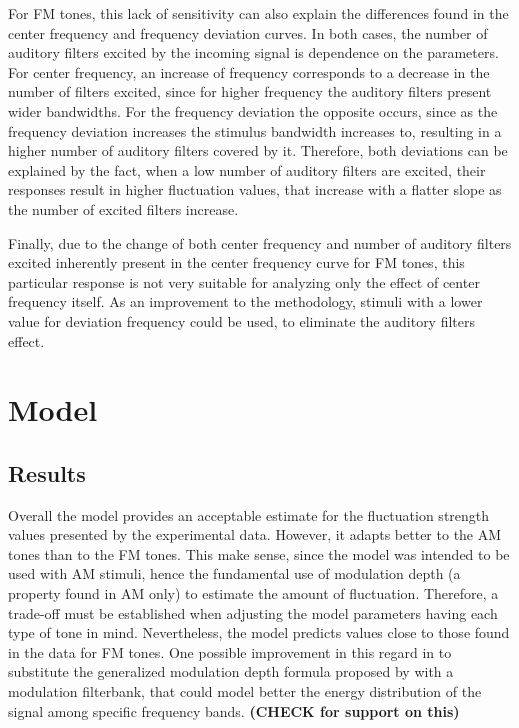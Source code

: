 \documentclass[../main.tex]{subfiles}
\begin{document}
For \gls{FM} tones, this lack of sensitivity can also explain the differences
found in the center frequency and frequency deviation curves. In both cases,
the number of auditory filters excited by the incoming signal is dependence on
the parameters. For center frequency, an increase of frequency corresponds to a
decrease in the number of filters excited, since for higher frequency the
auditory filters present wider bandwidths. For the frequency deviation the
opposite occurs, since as the frequency deviation increases the stimulus
bandwidth increases to, resulting in a higher number of auditory filters covered
by it. Therefore, both deviations can be explained by the fact, when a low
number of auditory filters are excited, their responses result in higher
fluctuation values, that increase with a flatter slope as the number of excited
filters increase.

Finally, due to the change of both center frequency and number of auditory
filters excited inherently present in the center frequency curve for \gls{FM}
tones, this particular response is not very suitable for analyzing only the
effect of center frequency itself. As an improvement to the methodology,
stimuli with a lower value for deviation frequency could be used, to eliminate
the auditory filters effect.

\section{Model}

\subsection{Results}

Overall the model provides an acceptable estimate for the fluctuation strength
values presented by the experimental data. However, it adapts better to the
\gls{AM} tones than to the \gls{FM} tones. This make sense, since the model
was intended to be used with \gls{AM} stimuli, hence the fundamental use of
modulation depth (a property found in \gls{AM} only) to estimate the amount of
fluctuation. Therefore, a trade-off must be established when adjusting the model
parameters having each type of tone in mind. Nevertheless, the model predicts
values close to those found in the data for \gls{FM} tones. One possible
improvement in this regard in to substitute the generalized modulation depth
formula proposed by \citeauthor{daniel1997psychoacoustical} with a modulation
filterbank, that could model better the energy distribution of the signal
among specific frequency bands. {\bfseries \color{red} (CHECK \cite{Dau1997} for
support on this)}
\end{document}
